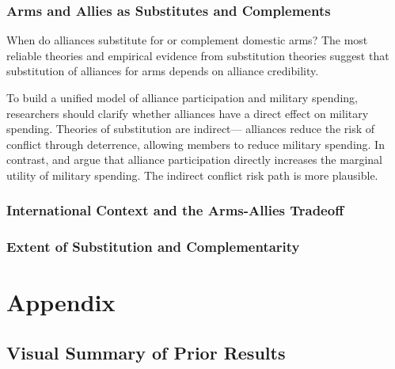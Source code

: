 \documentclass[12pt]{article}
\begin{document}
\subsubsection{Arms and Allies as Substitutes and Complements}


When do alliances substitute for or complement domestic arms? 
The most reliable theories and empirical evidence from substitution theories suggest that substitution of alliances for arms depends on alliance credibility. 


To build a unified model of alliance participation and military spending, researchers should clarify whether alliances have a direct effect on military spending. 
Theories of substitution are indirect--- alliances reduce the risk of conflict through deterrence, allowing members to reduce military spending. 
In contrast, \citet{Diehl1994} and \citet{MorganPalmer2006} argue that alliance participation directly increases the marginal utility of military spending. 
The indirect conflict risk path is more plausible. 


\subsubsection{International Context and the Arms-Allies Tradeoff}




\subsubsection{Extent of Substitution and Complementarity}





\section*{Appendix}

\subsection*{Visual Summary of Prior Results} 
\end{document}
